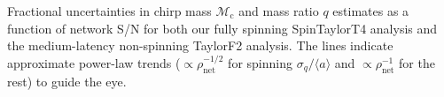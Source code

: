 \label{fig:Mc_q_std_snr} Fractional uncertainties in chirp mass $\mathcal{M}_\mathrm{c}$ and mass ratio $q$ estimates as a function of network S/N for both our fully spinning SpinTaylorT4 analysis and the medium-latency non-spinning TaylorF2 analysis. The lines indicate approximate power-law trends ($\propto \rho_\mathrm{net}^{-1/2}$ for spinning $\sigma_q/\langle a\rangle$ and $\propto \rho_\mathrm{net}^{-1}$ for the rest) to guide the eye.
  
  
  
  
  
  